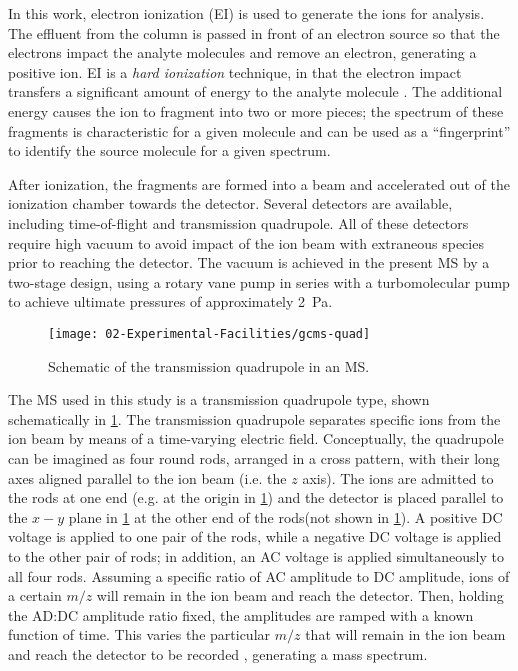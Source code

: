 \documentclass[../main.tex]{subfiles}
\begin{document}
In this work, electron ionization (EI) is used to generate the ions for
analysis. The effluent from the column is passed in front of an electron
source so that the electrons impact the analyte molecules and remove an
electron, generating a positive ion. EI is a \textit{hard ionization}
technique, in that the electron impact transfers a significant amount of energy
to the analyte molecule \cite{Sparkman2011}. The additional energy causes
the ion to fragment into two or more pieces; the spectrum of these fragments
is characteristic for a given molecule and can be used as a ``fingerprint''
to identify the source molecule for a given spectrum.

After ionization, the fragments are formed into a beam and accelerated out of the ionization
chamber towards the detector. Several detectors are available, including
time-of-flight and transmission quadrupole. All of these detectors require
high vacuum to avoid impact of the ion beam with extraneous species
prior to reaching the detector. The vacuum is achieved in the present
MS by a two-stage design, using a rotary vane pump in series with a
turbomolecular pump to achieve ultimate pressures of approximately \SI{2}{\pascal}.

\begin{figure}
\texttt{[image: 02-Experimental-Facilities/gcms-quad]}
\caption{Schematic of the transmission quadrupole in an MS.}
\label{fig:gcms-quad}
\end{figure}

The MS used in this study is a transmission quadrupole type, shown
schematically in \cref{fig:gcms-quad}. The transmission quadrupole separates
specific ions from the ion beam by
means of a time-varying electric field. Conceptually, the quadrupole
can be imagined as four round rods, arranged in a cross pattern, with
their long axes aligned parallel to the ion beam (i.e. the $z$ axis).
The ions are admitted to the rods at one end (e.g. at the origin in
\cref{fig:gcms-quad}) and the detector is placed parallel to the $x-y$ plane
in \cref{fig:gcms-quad} at the other end of the rods(not shown in
\cref{fig:gcms-quad}). A positive DC voltage is applied
to one pair of the rods, while a negative DC voltage is applied to the other
pair of rods; in addition, an AC voltage is applied simultaneously to all four
rods. Assuming a specific ratio of AC amplitude to DC amplitude, ions of a certain
$m/z$ will remain in the ion beam and reach the detector.
Then, holding the AD:DC amplitude ratio fixed, the amplitudes are ramped with a known
function of time. This varies the particular $m/z$ that will remain in the ion beam
and reach the detector to be recorded \cite{Sparkman2011}, generating a mass spectrum.
\end{document}
